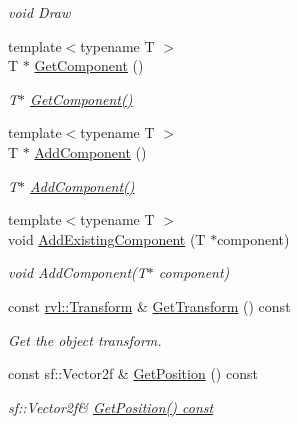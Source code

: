 \begin{DoxyCompactItemize}
\begin{DoxyCompactList}\small\item\em void Draw \end{DoxyCompactList}\item 
{\footnotesize template$<$typename T $>$ }\\T $\ast$ \hyperlink{classrvl_1_1_game_object_a27430c585db9256d39c8ece59cb76d16}{Get\+Component} ()
\begin{DoxyCompactList}\small\item\em T$\ast$ \hyperlink{classrvl_1_1_game_object_a27430c585db9256d39c8ece59cb76d16}{Get\+Component()} \end{DoxyCompactList}\item 
{\footnotesize template$<$typename T $>$ }\\T $\ast$ \hyperlink{classrvl_1_1_game_object_a84757644ca964d0f24e003d35bec60a7}{Add\+Component} ()
\begin{DoxyCompactList}\small\item\em T$\ast$ \hyperlink{classrvl_1_1_game_object_a84757644ca964d0f24e003d35bec60a7}{Add\+Component()} \end{DoxyCompactList}\item 
{\footnotesize template$<$typename T $>$ }\\void \hyperlink{classrvl_1_1_game_object_a63f068f892b213ef8f72501ed2967aa7}{Add\+Existing\+Component} (T $\ast$component)
\begin{DoxyCompactList}\small\item\em void Add\+Component(\+T$\ast$ component) \end{DoxyCompactList}\item 
const \hyperlink{classrvl_1_1_transform_component}{rvl\+::\+Transform} \& \hyperlink{classrvl_1_1_game_object_a615702097ce6345c12751c6ae2f33723}{Get\+Transform} () const
\begin{DoxyCompactList}\small\item\em Get the object transform. \end{DoxyCompactList}\item 
const sf\+::\+Vector2f \& \hyperlink{classrvl_1_1_game_object_a11cc37db9185b82c7df969abac1a4525}{Get\+Position} () const
\begin{DoxyCompactList}\small\item\em sf\+::\+Vector2f\& \hyperlink{classrvl_1_1_game_object_a11cc37db9185b82c7df969abac1a4525}{Get\+Position() const} \end{DoxyCompactList}\item 

\end{DoxyCompactItemize}
